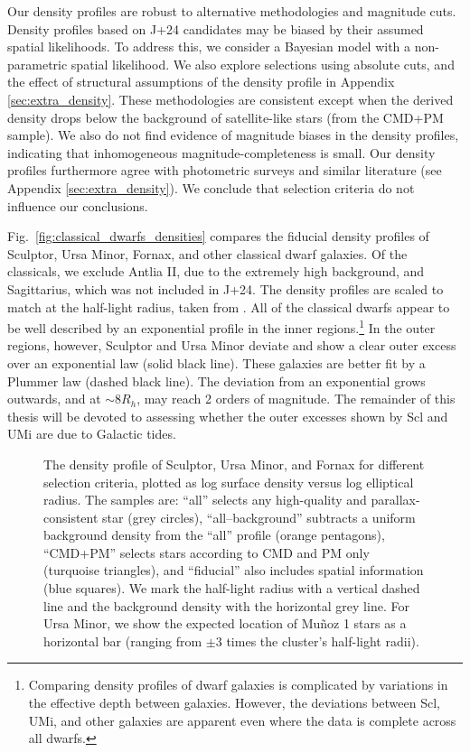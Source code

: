 Our density profiles are robust to alternative methodologies and
magnitude cuts. Density profiles based on J+24 candidates may be biased
by their assumed spatial likelihoods. To address this, we consider a
Bayesian model with a non-parametric spatial likelihood. We also explore
selections using absolute cuts, and the effect of structural assumptions
of the density profile in Appendix \ref{sec:extra_density}. These
methodologies are consistent except when the derived density drops below
the background of satellite-like stars (from the CMD+PM sample). We also
do not find evidence of magnitude biases in the density profiles,
indicating that inhomogeneous magnitude-completeness is small. Our
density profiles furthermore agree with photometric surveys and similar
literature (see Appendix \ref{sec:extra_density}). We conclude that
selection criteria do not influence our conclusions.

Fig.~\ref{fig:classical_dwarfs_densities} compares the fiducial density
profiles of Sculptor, Ursa Minor, Fornax, and other classical dwarf
galaxies. Of the classicals, we exclude Antlia II, due to the extremely
high background, and Sagittarius, which was not included in J+24. The
density profiles are scaled to match at the half-light radius, taken
from \citet{munoz+2018}. All of the classical dwarfs appear to be well
described by an exponential profile in the inner regions.\footnote{Comparing
  density profiles of dwarf galaxies is complicated by variations in the
  effective depth between galaxies. However, the deviations between Scl,
  UMi, and other galaxies are apparent even where the data is complete
  across all dwarfs.} In the outer regions, however, Sculptor and Ursa
Minor deviate and show a clear outer excess over an exponential law
(solid black line). These galaxies are better fit by a Plummer law
(dashed black line). The deviation from an exponential grows outwards,
and at \(\sim 8 R_h\), may reach 2 orders of magnitude. The remainder of
this thesis will be devoted to assessing whether the outer excesses
shown by Scl and UMi are due to Galactic tides.

\begin{figure}
\centering
{}
\caption[Density profiles for different \textit{Gaia} samples]{The
density profile of Sculptor, Ursa Minor, and Fornax for different
selection criteria, plotted as log surface density versus log elliptical
radius. The samples are: ``all'' selects any high-quality and
parallax-consistent star (grey circles), ``all--background'' subtracts a
uniform background density from the ``all'' profile (orange pentagons),
``CMD+PM'' selects stars according to CMD and PM only (turquoise
triangles), and ``fiducial'' also includes spatial information (blue
squares). We mark the half-light radius with a vertical dashed line and
the background density with the horizontal grey line. For Ursa Minor, we
show the expected location of Muñoz 1 stars as a horizontal bar (ranging
from \(\pm3\) times the cluster's half-light
radii).}\label{fig:scl_observed_profiles}
\end{figure}

